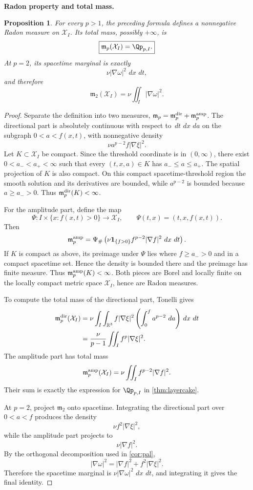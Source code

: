\documentclass[11pt]{article}
\newtheorem{proposition}[theorem]{Proposition}
\theoremstyle{definition}\newtheorem{definition}[theorem]{Definition}
\theoremstyle{remark}\newtheorem{remark}[theorem]{Remark}
\newcommand{\R}{\mathbb R}\newcommand{\dd}{\,d}\newcommand{\HH}{\mathcal H}
\begin{document}
\medskip
\noindent\textbf{Radon property and total mass.}
\begin{proposition}\label{prop:threshold-measure}
For every $p>1$, the preceding formula defines a nonnegative Radon measure on
$\mathcal X_I$.  Its total mass, possibly $+\infty$, is
\[
\boxed{
\mathfrak m_p(\mathcal X_I)=\Qp_{p,I}.
}
\]
At $p=2$, its spacetime marginal is exactly
\[
\boxed{
\nu|\nabla\omega|^2\,\dd x\,\dd t,
}
\]
and therefore
\[
\boxed{\mathfrak m_2(\mathcal X_I)=\nu\iint_I|\nabla\omega|^2.}
\]
\end{proposition}
\begin{proof}
Separate the definition into two measures,
$\mathfrak m_p=\mathfrak m_p^{\rm dir}+\mathfrak m_p^{\rm amp}$.
The directional part is absolutely continuous with respect to
$\dd t\,\dd x\,\dd a$ on the subgraph $0<a<f(x,t)$, with nonnegative density
\[
\nu a^{p-2}f|\nabla\xi|^2.
\]
Let $K\subset\mathcal X_I$ be compact.  Since the threshold coordinate is in
$(0,\infty)$, there exist $0<a_-<a_+<\infty$ such that every
$(t,x,a)\in K$ has $a_-\le a\le a_+$.  The spatial projection of $K$ is also
compact.  On this compact spacetime-threshold region the smooth solution and
its derivatives are bounded, while $a^{p-2}$ is bounded because
$a\ge a_->0$.  Thus $\mathfrak m_p^{\rm dir}(K)<\infty$.

For the amplitude part, define the map
\[
\Psi:I\times\{x:f(x,t)>0\}\longrightarrow\mathcal X_I,
\qquad
\Psi(t,x)=(t,x,f(x,t)).
\]
Then
\[
\mathfrak m_p^{\rm amp}
=\Psi_\#\left(
\nu\mathbf1_{\{f>0\}}f^{p-2}|\nabla f|^2\,\dd x\,\dd t
\right).
\]
If $K$ is compact as above, its preimage under $\Psi$ lies where
$f\ge a_->0$ and in a compact spacetime set.  Hence the density is bounded
there and the preimage has finite measure.  Thus
$\mathfrak m_p^{\rm amp}(K)<\infty$.  Both pieces are Borel and locally finite
on the locally compact metric space $\mathcal X_I$, hence are Radon measures.

To compute the total mass of the directional part, Tonelli gives
\[
\begin{aligned}
\mathfrak m_p^{\rm dir}(\mathcal X_I)
&=\nu\int_I\int_{\R^3}
 f|\nabla\xi|^2\left(\int_0^f a^{p-2}\,\dd a\right)\dd x\,\dd t\\
&=\frac{\nu}{p-1}\iint_I f^p|\nabla\xi|^2.
\end{aligned}
\]
The amplitude part has total mass
\[
\mathfrak m_p^{\rm amp}(\mathcal X_I)
=\nu\iint_I f^{p-2}|\nabla f|^2.
\]
Their sum is exactly the expression for $\Qp_{p,I}$ in
\cref{thm:layercake}.

At $p=2$, project $\mathfrak m_2$ onto spacetime.  Integrating the directional
part over $0<a<f$ produces the density
\[
\nu f^2|\nabla\xi|^2,
\]
while the amplitude part projects to
\[
\nu|\nabla f|^2.
\]
By the orthogonal decomposition used in \cref{cor:pal},
\[
|\nabla\omega|^2=|\nabla f|^2+f^2|\nabla\xi|^2.
\]
Therefore the spacetime marginal is
$\nu|\nabla\omega|^2\,\dd x\,\dd t$, and integrating it gives the final
identity.
\end{proof}
\end{document}
